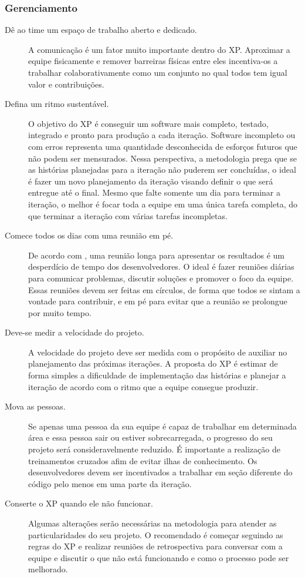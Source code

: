 \subsubsection{Gerenciamento}
\begin{description}
    \item[Dê ao time um espaço de trabalho aberto e dedicado.] A comunicação é um
    fator muito importante dentro do \acrlong{XP}. Aproximar a equipe fisicamente e
    remover barreiras físicas entre eles incentiva-os a trabalhar colaborativamente
    como um conjunto no qual todos tem igual valor e contribuições.
    \item[Defina um ritmo sustentável.] O objetivo do \gls{XP} é conseguir um software
    mais completo, testado, integrado e pronto para produção a cada iteração. Software
    incompleto ou com erros representa uma quantidade desconhecida de esforços futuros
    que não podem ser mensurados. Nessa perspectiva, a metodologia prega que se as
    histórias planejadas para a iteração não puderem ser concluídas, o ideal é fazer
    um novo planejamento da iteração visando definir o que será entregue até o final.
    Mesmo que falte somente um dia para terminar a iteração, o melhor é focar toda a
    equipe em uma única tarefa completa, do que terminar a iteração com várias tarefas
    incompletas.
    \item[Comece todos os dias com uma reunião em pé.] De acordo com ,
    uma reunião longa para apresentar os resultados é um desperdício de tempo dos
    desenvolvedores. O ideal é fazer reuniões diárias para comunicar problemas, discutir
    soluções e promover o foco da equipe. Essas reuniões devem ser feitas em círculos, de
    forma que todos se sintam a vontade para contribuir, e em pé para evitar que a reunião
    se prolongue por muito tempo.
    \item[Deve-se medir a velocidade do projeto.] A velocidade do projeto deve ser
    medida com o propósito de auxiliar no planejamento das próximas iterações. A proposta
    do \gls{XP} é estimar de forma simples a dificuldade de implementação das histórias
    e planejar a iteração de acordo com o ritmo que a equipe consegue produzir.
    \item[Mova as pessoas.] Se apenas uma pessoa da sua equipe é capaz de trabalhar
    em determinada área e essa pessoa sair ou estiver sobrecarregada, o progresso do seu
    projeto será consideravelmente reduzido. É importante a realização de treinamentos
    cruzados afim de evitar ilhas de conhecimento. Os desenvolvedores devem ser
    incentivados a trabalhar em seção diferente do código pelo menos em uma parte da
    iteração.
    \item[Conserte o \gls{XP} quando ele não funcionar.] Algumas alterações serão
    necessárias na metodologia para atender as particularidades do seu projeto. O
    recomendado é começar seguindo as regras do \gls{XP} e realizar reuniões de
    retrospectiva para conversar com a equipe e discutir o que não está funcionando
    e como o processo pode ser melhorado.
\end{description}

